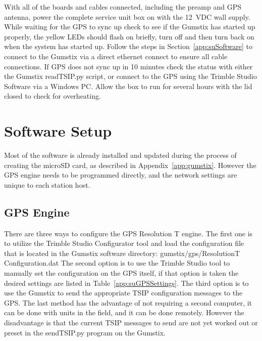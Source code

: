 With all of the boards and cables connected, including the preamp and GPS antenna, power the complete service unit box on with the 12~VDC wall supply.
While waiting for the GPS to sync up check to see if the Gumstix has started up properly, the yellow LEDs should flash on briefly, turn off and then turn back on when the system has started up.
Follow the steps in Section~\ref{app:suSoftware} to connect to the Gumstix via a direct ethernet connect to ensure all cable connections.
If GPS does not sync up in 10 minutes check the status with either the Gumstix readTSIP.py script, or connect to the GPS using the Trimble Studio Software via a Windows PC.
Allow the box to run for several hours with the lid closed to check for overheating.

\section{Software Setup}

Most of the software is already installed and updated during the process of creating the microSD card, as described in Appendix~\ref{app:gumstix}.
However the GPS engine needs to be programmed directly, and the network settings are unique to each station host.

\subsection{GPS Engine}

There are three ways to configure the GPS Resolution T engine.
The first one is to utilize the Trimble Studio Configurator tool and load the configuration file that is located in the Gumstix software directory: gumstix/gps/ResolutionT Configuration.dat
The second option is to use the Trimble Studio tool to manually set the configuration on the GPS itself, if that option is taken the desired settings are listed in Table~\ref{app:suGPSSettings}.
The third option is to use the Gumstix to send the appropriate TSIP configuration messages to the GPS.
The last method has the advantage of not requiring a second computer, it can be done with units in the field, and it can be done remotely.
However the disadvantage is that the current TSIP messages to send are not yet worked out or preset in the sendTSIP.py program on the Gumstix.

